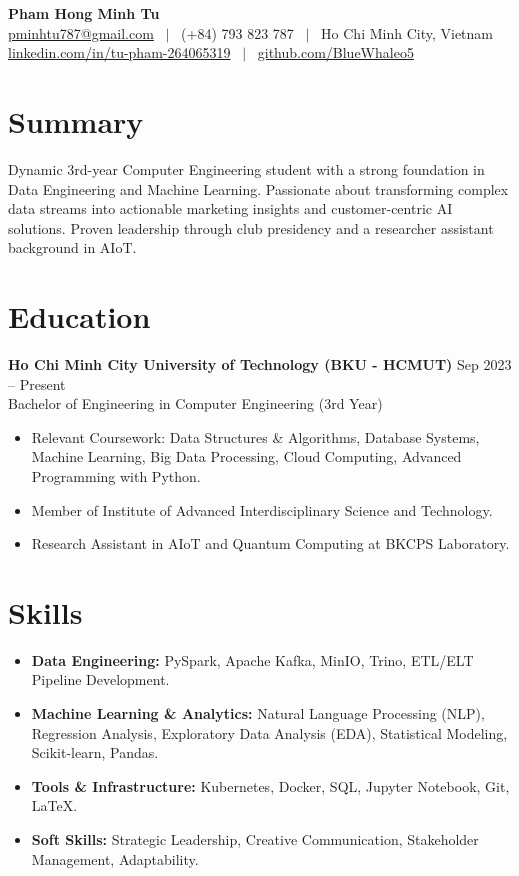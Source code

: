 \documentclass[a4paper,10pt]{article}
\begin{document}

\begin{center}
    {\Huge \textbf{Pham Hong Minh Tu}} \\
    \medskip
    \href{mailto:pminhtu787@gmail.com}{pminhtu787@gmail.com} \ $|$ \ (+84) 793 823 787 \ $|$ \ Ho Chi Minh City, Vietnam \\
    \href{https://linkedin.com/in/tu-pham-264065319/}{linkedin.com/in/tu-pham-264065319} \ $|$ \ \href{https://github.com/BlueWhaleo5}{github.com/BlueWhaleo5}
\end{center}

\section{Summary}
Dynamic 3rd-year Computer Engineering student with a strong foundation in Data Engineering and Machine Learning. Passionate about transforming complex data streams into actionable marketing insights and customer-centric AI solutions. Proven leadership through club presidency and a researcher assistant background in AIoT.

\section{Education}
\textbf{Ho Chi Minh City University of Technology (BKU - HCMUT)} \hfill Sep 2023 -- Present \\
Bachelor of Engineering in Computer Engineering (3rd Year) \\
\begin{itemize}
    \item Relevant Coursework: Data Structures \& Algorithms, Database Systems, Machine Learning, Big Data Processing, Cloud Computing, Advanced Programming with Python.
    \item Member of Institute of Advanced Interdisciplinary Science and Technology.
    \item Research Assistant in AIoT and Quantum Computing at BKCPS Laboratory.
\end{itemize}

\section{Skills}
\begin{itemize}
    \item \textbf{Data Engineering:} PySpark, Apache Kafka, MinIO, Trino, ETL/ELT Pipeline Development.
    \item \textbf{Machine Learning \& Analytics:} Natural Language Processing (NLP), Regression Analysis, Exploratory Data Analysis (EDA), Statistical Modeling, Scikit-learn, Pandas.
    \item \textbf{Tools \& Infrastructure:} Kubernetes, Docker, SQL, Jupyter Notebook, Git, LaTeX.
    \item \textbf{Soft Skills:} Strategic Leadership, Creative Communication, Stakeholder Management, Adaptability.
\end{itemize}
\end{document}
